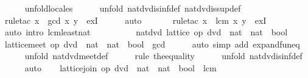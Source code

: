 \begin{isabellebody}
\ \ \ \ \isamarkupfalse%
\ unfold{\isacharunderscore}locales\isanewline
\ \ \ \ \isamarkupfalse%
\ {\isacharparenleft}unfold\ nat{\isacharunderscore}dvd{\isachardot}is{\isacharunderscore}inf{\isacharunderscore}def\ nat{\isacharunderscore}dvd{\isachardot}is{\isacharunderscore}sup{\isacharunderscore}def{\isacharparenright}\isanewline
\ \ \ \ \isamarkupfalse%
\ {\isacharparenleft}rule{\isacharunderscore}tac\ x\ {\isacharequal}\ {\isachardoublequoteopen}gcd\ x\ y{\isachardoublequoteclose}\ \ exI{\isacharparenright}\isanewline
\ \ \ \ \isamarkupfalse%
\ auto\ {\isacharbrackleft}{}{\isacharbrackright}\isanewline
\ \ \ \ \isamarkupfalse%
\ {\isacharparenleft}rule{\isacharunderscore}tac\ x\ {\isacharequal}\ {\isachardoublequoteopen}lcm\ x\ y{\isachardoublequoteclose}\ \ exI{\isacharparenright}\isanewline
\ \ \ \ \isamarkupfalse%
\ {\isacharparenleft}auto\ intro{\isacharcolon}\ lcm{\isacharunderscore}least{\isacharunderscore}nat{\isacharparenright}\isanewline
\ \ \ \ \isamarkupfalse%
\isanewline
\ \ \isamarkupfalse%
\ \isamarkupfalse%
\ nat{\isacharunderscore}dvd{\isacharcolon}\ lattice\ {\isachardoublequoteopen}op\ dvd\ {\isacharcolon}{\isacharcolon}\ nat\ {\isasymRightarrow}\ nat\ {\isasymRightarrow}\ bool{\isachardoublequoteclose}\ \isacommand{{\isachardot}}\isamarkupfalse%
\isanewline
\ \ \isamarkupfalse%
\ {\isachardoublequoteopen}lattice{\isachardot}meet\ {\isacharparenleft}op\ dvd\ {\isacharcolon}{\isacharcolon}\ nat\ {\isasymRightarrow}\ nat\ {\isasymRightarrow}\ bool{\isacharparenright}\ {\isacharequal}\ gcd{\isachardoublequoteclose}\isanewline
\ \ \ \ \isamarkupfalse%
\ {\isacharparenleft}auto\ simp\ add{\isacharcolon}\ expand{\isacharunderscore}fun{\isacharunderscore}eq{\isacharparenright}\isanewline
\ \ \ \ \isamarkupfalse%
\ {\isacharparenleft}unfold\ nat{\isacharunderscore}dvd{\isachardot}meet{\isacharunderscore}def{\isacharparenright}\isanewline
\ \ \ \ \isamarkupfalse%
\ {\isacharparenleft}rule\ the{\isacharunderscore}equality{\isacharparenright}\isanewline
\ \ \ \ \isamarkupfalse%
\ {\isacharparenleft}unfold\ nat{\isacharunderscore}dvd{\isachardot}is{\isacharunderscore}inf{\isacharunderscore}def{\isacharparenright}\isanewline
\ \ \ \ \isamarkupfalse%
\ auto\isanewline
\ \ \isamarkupfalse%
\ {\isachardoublequoteopen}lattice{\isachardot}join\ {\isacharparenleft}op\ dvd\ {\isacharcolon}{\isacharcolon}\ nat\ {\isasymRightarrow}\ nat\ {\isasymRightarrow}\ bool{\isacharparenright}\ {\isacharequal}\ lcm{\isachardoublequoteclose}\isanewline

\end{isabellebody}
